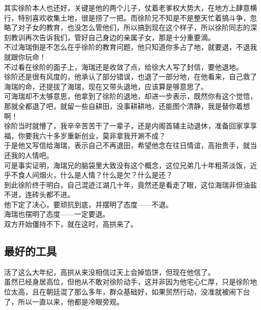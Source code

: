 \begin{multicols}{\theparacolNo}
其实徐阶本人也还好，关键是他的两个儿子，仗着老爹权大势大，在地方上肆意横行，特别喜欢收集土地，很是捞了一把。而徐阶兄不知是不是整天忙着搞斗争，忽略了对子女的教育，也没怎么管他们，所以搞到现在这个样子，所以徐阶同志的深刻教训再次告诉我们，管好自己身边的亲属子女，那是十分重要滴。\\

不过海瑞倒是不怎么在乎徐阶的教育问题，他只知道你多占了地，就要退，不退我就跟你玩命！\\

不过看在徐阶的面子上，海瑞还是收敛了点，给徐大人写了封信，要他退地。\\

徐阶还是很有风度的，他承认了部分错误，也退了一部分地，在他看来，自己救了海瑞的命，还提拔了海瑞，现在又带头退地，应该算是够意思了。\\

可海瑞却不太够意思，他拿到了徐阶的退地，却进一步表示，既然你有这个觉悟，那就全都退了吧，就留一些自耕田，没事耕耕地，还能图个清静，我是替你着想啊！\\

徐阶当时就懵了，我辛辛苦苦干了一辈子，还是内阁首辅主动退休，准备回家享享福，你要我六十多岁重新创业，莫非拿我开涮不成？\\

于是他又写信给海瑞，表示自己不再退田，希望他念在往日情谊，高抬贵手，就当还我的人情吧。\\

可是事实证明，海瑞兄的脑袋里大致没有这个概念，这位兄弟几十年粗茶淡饭，近乎不食人间烟火，什么是人情？什么是欠？什么是还？\\

到此徐阶终于明白，自己混迹江湖几十年，竟然还是看走了眼，这位海瑞非但油盐不进，连砖头都不进。\\

他下定了决心，要顽抗到底，并摆明了态度——不退。\\

海瑞也摆明了态度——一定要退。\\

双方开始僵持不下，就在这时，高拱来了。\\

\subsection{最好的工具}
活了这么大年纪，高拱从来没相信过天上会掉馅饼，但现在他信了。\\

虽然已经身居高位，但他从不敢对徐阶动手，这并非因为他宅心仁厚，只是徐阶地位太高，且在朝廷混了那么多年，群众基础好，如果贸然行动，没准就被闹下台了，所以一直以来，他都是冷眼旁观。\\


\end{multicols}
